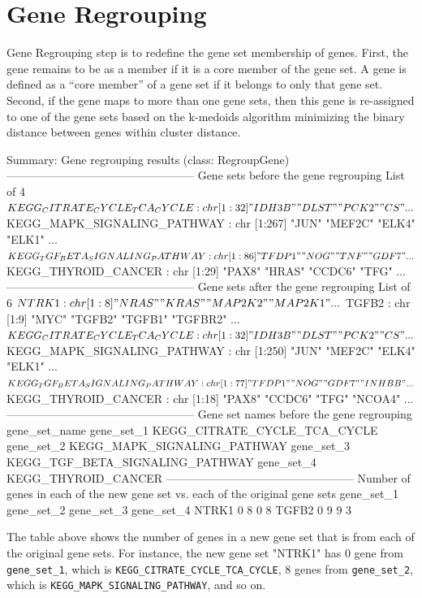 \documentclass[11pt]{article}
\begin{document}
\section{Gene Regrouping}
Gene Regrouping step is to redefine the gene set membership of genes. First, the gene remains to be as a member if it is a core member of the gene set.  A gene is defined as a “core member” of a gene set if it belongs to only that gene set.  Second, if the gene maps to more than one gene sets, then this gene is re-assigned to one of the gene sets based on the k-medoids algorithm minimizing the binary distance between genes within cluster distance.

\begin{Schunk}
\begin{Soutput}
Summary: Gene regrouping results (class: RegroupGene)
--------------------------------------------------
Gene sets before the gene regrouping
List of 4
 $ KEGG_CITRATE_CYCLE_TCA_CYCLE   : chr [1:32] "IDH3B" "DLST" "PCK2" "CS" ...
 $ KEGG_MAPK_SIGNALING_PATHWAY    : chr [1:267] "JUN" "MEF2C" "ELK4" "ELK1" ...
 $ KEGG_TGF_BETA_SIGNALING_PATHWAY: chr [1:86] "TFDP1" "NOG" "TNF" "GDF7" ...
 $ KEGG_THYROID_CANCER            : chr [1:29] "PAX8" "HRAS" "CCDC6" "TFG" ...
--------------------------------------------------
Gene sets after the gene regrouping
List of 6
 $ NTRK1                          : chr [1:8] "NRAS" "KRAS" "MAP2K2" "MAP2K1" ...
 $ TGFB2                          : chr [1:9] "MYC" "TGFB2" "TGFB1" "TGFBR2" ...
 $ KEGG_CITRATE_CYCLE_TCA_CYCLE   : chr [1:32] "IDH3B" "DLST" "PCK2" "CS" ...
 $ KEGG_MAPK_SIGNALING_PATHWAY    : chr [1:250] "JUN" "MEF2C" "ELK4" "ELK1" ...
 $ KEGG_TGF_BETA_SIGNALING_PATHWAY: chr [1:77] "TFDP1" "NOG" "GDF7" "INHBB" ...
 $ KEGG_THYROID_CANCER            : chr [1:18] "PAX8" "CCDC6" "TFG" "NCOA4" ...
--------------------------------------------------
Gene set names before the gene regrouping
                             gene_set_name
gene_set_1    KEGG_CITRATE_CYCLE_TCA_CYCLE
gene_set_2     KEGG_MAPK_SIGNALING_PATHWAY
gene_set_3 KEGG_TGF_BETA_SIGNALING_PATHWAY
gene_set_4             KEGG_THYROID_CANCER
--------------------------------------------------
Number of genes in each of the new gene set vs. each of the original gene sets
      gene_set_1 gene_set_2 gene_set_3 gene_set_4
NTRK1          0          8          0          8
TGFB2          0          9          9          3
\end{Soutput}
\end{Schunk}
The table above shows the number of genes in a new gene set that is from each of the original gene sets. For instance, the new gene set "NTRK1" has 0 gene from \texttt{gene\_set\_1}, which is \texttt{KEGG\_CITRATE\_CYCLE\_TCA\_CYCLE}, 8 genes from \texttt{gene\_set\_2}, which is \texttt{KEGG\_MAPK\_SIGNALING\_PATHWAY}, and so on.
\end{document}
